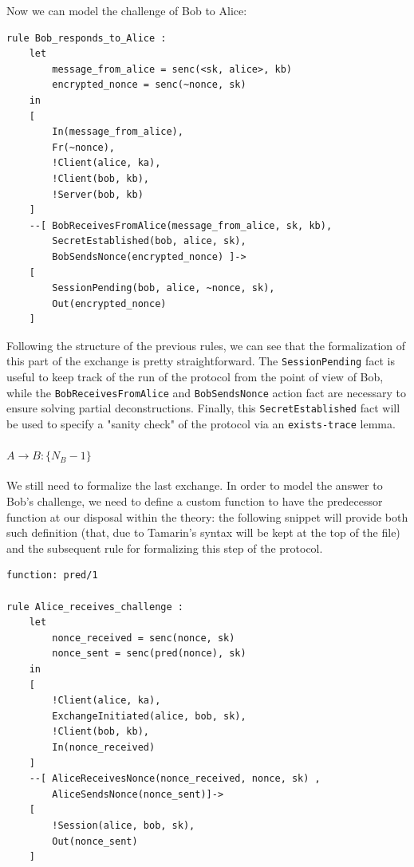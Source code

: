 \documentclass[fleqn,10pt]{SelfArx} %
\newcounter{definition}[section]\setcounter{definition}{0}
\begin{document}
Now we can model the challenge of Bob to Alice:

\begin{lstlisting}[language=Tamarin]
rule Bob_responds_to_Alice :
    let
        message_from_alice = senc(<sk, alice>, kb)
        encrypted_nonce = senc(~nonce, sk)
    in
    [
        In(message_from_alice),
        Fr(~nonce),
        !Client(alice, ka),
        !Client(bob, kb),
        !Server(bob, kb)
    ]
    --[ BobReceivesFromAlice(message_from_alice, sk, kb),
        SecretEstablished(bob, alice, sk),
        BobSendsNonce(encrypted_nonce) ]->
    [
        SessionPending(bob, alice, ~nonce, sk),
        Out(encrypted_nonce)
    ]
\end{lstlisting}

Following the structure of the previous rules, we can see that the formalization of this part of the exchange is pretty straightforward. The \lstinline|SessionPending| fact is useful to keep track of the run of the protocol from the point of view of Bob, while the \lstinline|BobReceivesFromAlice| and \lstinline|BobSendsNonce| action fact are necessary to ensure solving partial deconstructions. Finally, this \lstinline|SecretEstablished| fact will be used to specify a "sanity check" of the protocol via an \lstinline|exists-trace| lemma.

\paragraph{$A \to B: \{N_B - 1\}$}

We still need to formalize the last exchange. In order to model the answer to Bob's challenge, we need to define a custom function to have the predecessor function at our disposal within the theory: the following snippet will provide both such definition (that, due to Tamarin's syntax will be kept at the top of the file) and the subsequent rule for formalizing this step of the protocol.

\begin{lstlisting}[language=Tamarin]
function: pred/1

rule Alice_receives_challenge :
    let
        nonce_received = senc(nonce, sk)
        nonce_sent = senc(pred(nonce), sk)
    in
    [
        !Client(alice, ka),
        ExchangeInitiated(alice, bob, sk),
        !Client(bob, kb),
        In(nonce_received)
    ]
    --[ AliceReceivesNonce(nonce_received, nonce, sk) ,
        AliceSendsNonce(nonce_sent)]->
    [
        !Session(alice, bob, sk),
        Out(nonce_sent)
    ]
\end{lstlisting}
\end{document}
